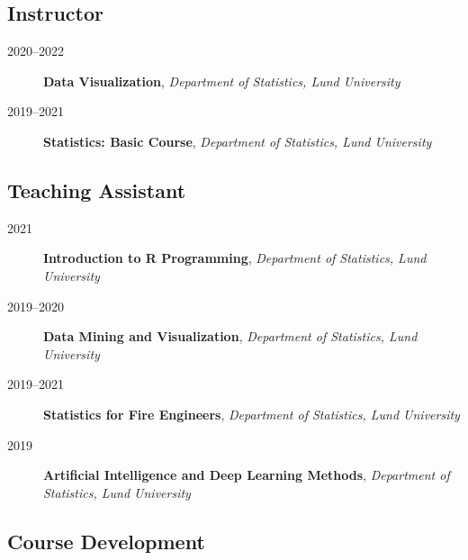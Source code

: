 \documentclass[
  10pt,
  headsepline=true,
  english,
  DIV=12
]{scrartcl}
\renewcommand*{%
  \mkbibnamegiven
}[1]{\ifitemannotation{highlight}{\textbf{#1}}{#1}}
\renewcommand*{%
  \mkbibnamefamily
}[1]{\ifitemannotation{highlight}{\textbf{#1}}{#1}}
\begin{document}
\subsection{Instructor}

\begin{description}
  \item[2020--2022]{
              \textbf{Data Visualization}, \emph{Department of Statistics, Lund
                University}
        }
  \item[2019--2021]{
              \textbf{Statistics: Basic Course}, \emph{Department of Statistics, Lund
                University}

        }
\end{description}

\subsection{Teaching Assistant}

\begin{description}

  \item[2021]{
              \textbf{Introduction to R Programming}, \emph{Department of Statistics,
                Lund University}
        }

  \item[2019--2020]{
              \textbf{Data Mining and Visualization}, \emph{Department of Statistics,
                Lund University}

        }

  \item[2019--2021]{
              \textbf{Statistics for Fire Engineers},
              \emph{Department of Statistics, Lund University}
        }

  \item[2019]{
              \textbf{Artificial Intelligence and Deep Learning Methods},
              \emph{Department of Statistics, Lund University}

        }
\end{description}

\subsection{Course Development}
\end{document}
